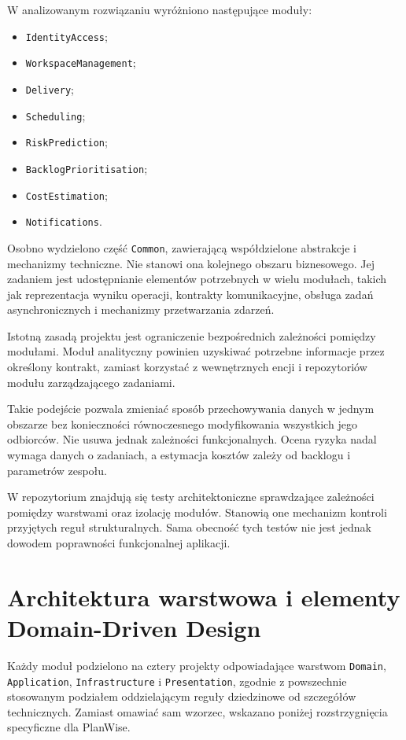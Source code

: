 W analizowanym rozwiązaniu wyróżniono następujące moduły:

\begin{itemize}
    \item \texttt{IdentityAccess};
    \item \texttt{WorkspaceManagement};
    \item \texttt{Delivery};
    \item \texttt{Scheduling};
    \item \texttt{RiskPrediction};
    \item \texttt{BacklogPrioritisation};
    \item \texttt{CostEstimation};
    \item \texttt{Notifications}.
\end{itemize}

Osobno wydzielono część \texttt{Common}, zawierającą współdzielone abstrakcje i mechanizmy techniczne. Nie stanowi ona kolejnego obszaru biznesowego. Jej zadaniem jest udostępnianie elementów potrzebnych w wielu modułach, takich jak reprezentacja wyniku operacji, kontrakty komunikacyjne, obsługa zadań asynchronicznych i mechanizmy przetwarzania zdarzeń.

Istotną zasadą projektu jest ograniczenie bezpośrednich zależności pomiędzy modułami. Moduł analityczny powinien uzyskiwać potrzebne informacje przez określony kontrakt, zamiast korzystać z wewnętrznych encji i repozytoriów modułu zarządzającego zadaniami.

Takie podejście pozwala zmieniać sposób przechowywania danych w jednym obszarze bez konieczności równoczesnego modyfikowania wszystkich jego odbiorców. Nie usuwa jednak zależności funkcjonalnych. Ocena ryzyka nadal wymaga danych o zadaniach, a estymacja kosztów zależy od backlogu i parametrów zespołu.

W repozytorium znajdują się testy architektoniczne sprawdzające zależności pomiędzy warstwami oraz izolację modułów. Stanowią one mechanizm kontroli przyjętych reguł strukturalnych. Sama obecność tych testów nie jest jednak dowodem poprawności funkcjonalnej aplikacji.

\section{Architektura warstwowa i elementy Domain-Driven Design}

Każdy moduł podzielono na cztery projekty odpowiadające warstwom \texttt{Domain}, \texttt{Application}, \texttt{Infrastructure} i \texttt{Presentation}, zgodnie z powszechnie stosowanym podziałem oddzielającym reguły dziedzinowe od szczegółów technicznych. Zamiast omawiać sam wzorzec, wskazano poniżej rozstrzygnięcia specyficzne dla PlanWise.

